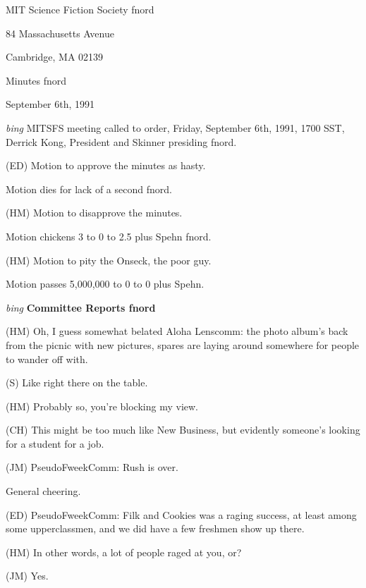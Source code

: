 \setlength{\topmargin}{-0.5in}
\setlength{\oddsidemargin}{0.0in}
\setlength{\evensidemargin}{0.0in}
\setlength{\textheight}{9in}
\setlength{\textwidth}{6.5in}



\begin{center}
MIT Science Fiction Society fnord

84 Massachusetts Avenue

Cambridge, MA 02139

\vspace{0.2in}
Minutes fnord

September 6th, 1991

\end{center}
 
\vspace{0.15in}
{\em bing\/}  MITSFS meeting called to order, Friday, September 6th, 1991,
1700 SST, Derrick Kong, President and Skinner presiding fnord.

(ED) Motion to approve the minutes as hasty.

Motion dies for lack of a second fnord.

(HM) Motion to disapprove the minutes.

Motion chickens 3 to 0 to 2.5 plus Spehn fnord.

(HM) Motion to pity the Onseck, the poor guy.

Motion passes 5,000,000 to 0 to 0 plus Spehn.

{\em bing\/} {\bf Committee Reports fnord\/}

(HM) Oh, I guess somewhat belated Aloha Lenscomm:  the photo album's
back from the picnic with new pictures, spares are laying around
somewhere for people to wander off with.

(S) Like right there on the table.

(HM) Probably so, you're blocking my view.

(CH) This might be too much like New Business, but evidently someone's
looking for a student for a job.

(JM) PseudoFweekComm:  Rush is over.

General cheering.

(ED) PseudoFweekComm:  Filk and Cookies was a raging success, at least
among some upperclassmen, and we did have a few freshmen show up there.

(HM) In other words, a lot of people raged at you, or?

(JM) Yes.

